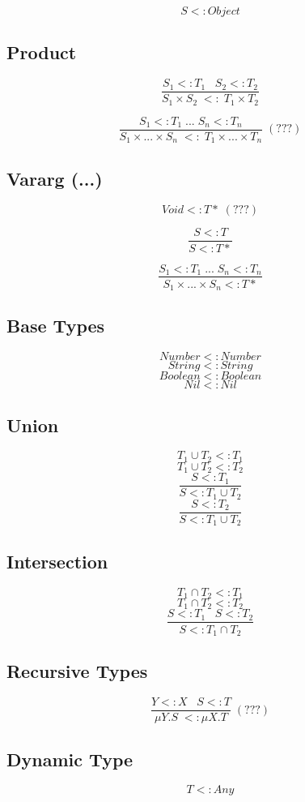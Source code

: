 \documentclass[12pt]{article}
\begin{document}
\[
S <: Object
\]

\subsection{Product}

\[
\frac{S_{1} <: T_{1} \;\;\; S_{2} <: T_{2}}
     {S_{1} \times S_{2} \; <: \; T_{1} \times T_{2}}
\]

\[
\frac{S_{1} <: T_{1} \; ... \; S_{n} <: T_{n}}
     {S_{1} \times ... \times S_{n} \; <: \; T_{1} \times ... \times T_{n}} \; (???)
\]

\subsection{Vararg (...)}

\[
Void <: {T*} \; (???)
\]

\[
\frac{S <: T}
     {S <: {T*}}
\]

\[
\frac{S_{1} <: T_{1} \; ... \; S_{n} <: T_{n}}
     {S_{1} \times ... \times S_{n} <: {T*}}
\]

\subsection{Base Types}

\[
Number <: Number
\]
\[
String <: String
\]
\[
Boolean <: Boolean
\]
\[
Nil <: Nil
\]

\subsection{Union}

\[
T_{1} \cup T_{2} <: T_{1}
\]
\[
T_{1} \cup T_{2} <: T_{2}
\]
\[
\frac{S <: T_{1}}
     {S <: T_{1} \cup T_{2}}
\]
\[
\frac{S <: T_{2}}
     {S <: T_{1} \cup T_{2}}
\]

\subsection{Intersection}

\[
T_{1} \cap T_{2} <: T_{1}
\]
\[
T_{1} \cap T_{2} <: T_{2}
\]
\[
\frac{S <: T_{1} \;\;\; S <: T_{2}}
     {S <: T_{1} \cap T_{2}}
\]

\subsection{Recursive Types}

\[
\frac{Y <: X \;\;\; S <: T}
     {\mu Y.S \; <: \mu X.T} \; (???)
\]

\subsection{Dynamic Type}

\[
T <: Any
\]
\end{document}

